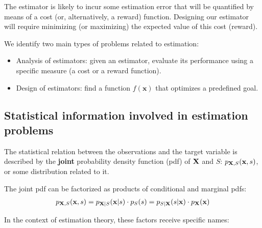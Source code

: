 The estimator is likely to incur some estimation error that will be quantified by means of a cost (or, alternatively, a reward) function. Designing our estimator will require minimizing (or maximizing) the expected value of this cost (reward).

We identify two main types of problems related to estimation:
\begin{itemize}
\item Analysis of estimators: given an estimator, evaluate its performance using a specific measure (a cost or a reward function).
\item Design of estimators: find a function $f(\mathbf{x})$ that optimizes a predefined goal.
\end{itemize}


\subsection{Statistical information involved in estimation problems}
\label{subsec:statistical_info}

The statistical relation between the observations and the target variable is described by the {\bf joint} probability density function (pdf) of ${\bf X}$ and $S$: $p_{{\bf X},S}({\bf x},s)$, or some distribution related to it. 

The joint pdf can be factorized as products of conditional and marginal pdfs:
\begin{align}
p_{{\bf X},S}({\bf x},s) = p_{{\bf X}| S}({\bf x}| s) \cdot p_S(s) 
                         = p_{S|{\bf X}}(s|{\bf x}) \cdot p_{\bf X}({\bf x}) 
\end{align}

In the context of estimation theory, these factors receive specific names:


